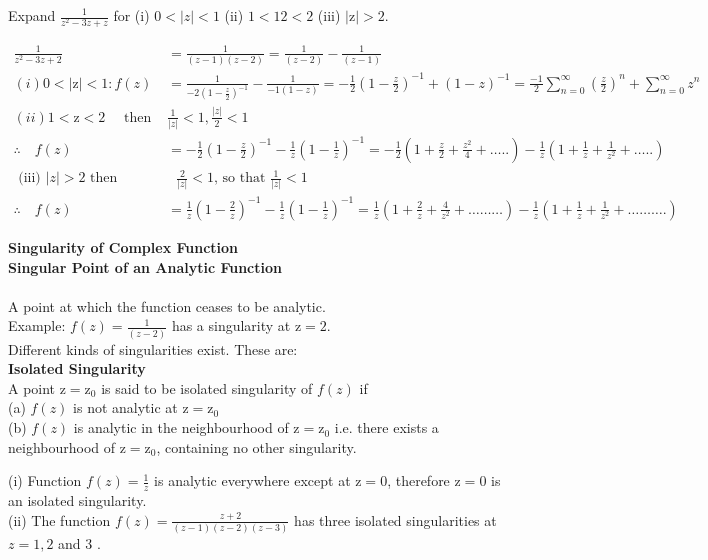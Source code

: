 \begin{exercise}
	Expand $\frac{1}{z^{2}-3 z+z}$ for (i) $0<|z|<1$
	(ii) $1<12<2$
	(iii) $|\mathrm{z}|>2$.
\end{exercise}
\begin{answer}
	\begin{align*}
	\frac{1}{z^{2}-3 z+2}&=\frac{1}{(z-1)(z-2)}=\frac{1}{(z-2)}-\frac{1}{(z-1)}\\
	(i) 0<|\mathrm{z}|<1: f(z)
	&=\frac{1}{-2\left(1-\frac{z}{2}\right)^{-1}}-\frac{1}{-1(1-z)}=-\frac{1}{2}\left(1-\frac{z}{2}\right)^{-1}+(1-z)^{-1}=\frac{-1}{2} \sum_{n=0}^{\infty}\left(\frac{z}{2}\right)^{n}+\sum_{n=0}^{\infty} z^{n}\\
	(ii) 1<\mathrm{z}<2 \quad\text{ then }&\frac{1}{|z|}<1, \frac{|z|}{2}<1\\
	\therefore \quad f(z)&=-\frac{1}{2}\left(1-\frac{z}{2}\right)^{-1}-\frac{1}{z}\left(1-\frac{1}{z}\right)^{-1}=-\frac{1}{2}\left(1+\frac{z}{2}+\frac{z^{2}}{4}+\ldots . .\right)-\frac{1}{z}\left(1+\frac{1}{z}+\frac{1}{z^{2}}+\ldots . .\right)\\
\text{	(iii) $|z|>2$  then}&\text{ $\frac{2}{|z|}<1$, so that $\frac{1}{|z|}<1$}\\
	\therefore \quad f(z)&=\frac{1}{z}\left(1-\frac{2}{z}\right)^{-1}-\frac{1}{z}\left(1-\frac{1}{z}\right)^{-1}=\frac{1}{z}\left(1+\frac{2}{z}+\frac{4}{z^{2}}+\ldots \ldots \ldots\right)-\frac{1}{z}\left(1+\frac{1}{z}+\frac{1}{z^{2}}+\ldots \ldots \ldots .\right)
	\end{align*}
\end{answer}
\textbf{Singularity of Complex Function}\\
\textbf{Singular Point of an Analytic Function}\\\\
A point at which the function ceases to be analytic.\\
Example: $f(z)=\frac{1}{(z-2)}$ has a singularity at $\mathrm{z}=2$.\\
Different kinds of singularities exist. These are:\\
\textbf{Isolated Singularity}\\
A point $\mathrm{z}=\mathrm{z}_{0}$ is said to be isolated singularity of $f(z)$ if\\
(a) $f(z)$ is not analytic at $\mathrm{z}=\mathrm{z}_{0}$\\
(b) $f(z)$ is analytic in the neighbourhood of $\mathrm{z}=\mathrm{z}_{0}$ i.e. there exists a neighbourhood of $\mathrm{z}=\mathrm{z}_{0}$, containing no other singularity.
\begin{exercise}
	(i) Function $f(z)=\frac{1}{z}$ is analytic everywhere except at $\mathrm{z}=0$, therefore $\mathrm{z}=0$ is an isolated singularity.\\
	(ii) The function $f(z)=\frac{z+2}{(z-1)(z-2)(z-3)}$ has three isolated singularities at $z=1,2$ and 3 .
\end{exercise}
